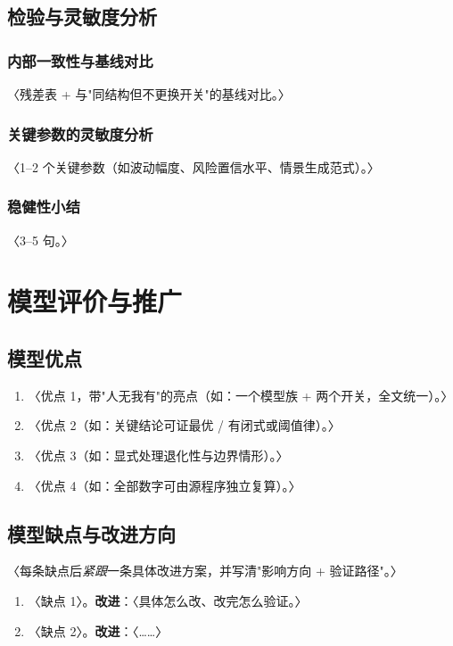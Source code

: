 \documentclass[12pt,a4paper]{ctexart}
\begin{document}
\subsection{检验与灵敏度分析}
\subsubsection{内部一致性与基线对比}
〈残差表 + 与"同结构但不更换开关"的基线对比。〉
\subsubsection{关键参数的灵敏度分析}
〈1–2 个关键参数（如波动幅度、风险置信水平、情景生成范式）。〉
\subsubsection{稳健性小结}
〈3–5 句。〉


\section{模型评价与推广}\label{sec:evaluation}

\subsection{模型优点}
\begin{enumerate}
  \item 〈优点 1，带"人无我有"的亮点（如：一个模型族 + 两个开关，全文统一）。〉
  \item 〈优点 2（如：关键结论可证最优 / 有闭式或阈值律）。〉
  \item 〈优点 3（如：显式处理退化性与边界情形）。〉
  \item 〈优点 4（如：全部数字可由源程序独立复算）。〉
\end{enumerate}

\subsection{模型缺点与改进方向}
〈每条缺点后\emph{紧跟}一条具体改进方案，并写清"影响方向 + 验证路径"。〉
\begin{enumerate}
  \item 〈缺点 1〉。\textbf{改进}：〈具体怎么改、改完怎么验证。〉
  \item 〈缺点 2〉。\textbf{改进}：〈……〉
\end{enumerate}
\end{document}
